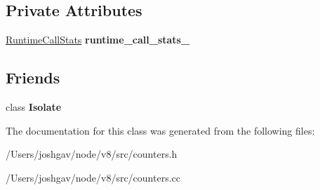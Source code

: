 \subsection*{Private Attributes}
\begin{DoxyCompactItemize}
\item 
\hyperlink{structv8_1_1internal_1_1_runtime_call_stats}{Runtime\+Call\+Stats} {\bfseries runtime\+\_\+call\+\_\+stats\+\_\+}\hypertarget{classv8_1_1internal_1_1_counters_a9da55aec8a3681c86625c43f1db4a97d}{}\label{classv8_1_1internal_1_1_counters_a9da55aec8a3681c86625c43f1db4a97d}

\end{DoxyCompactItemize}
\subsection*{Friends}
\begin{DoxyCompactItemize}
\item 
class {\bfseries Isolate}\hypertarget{classv8_1_1internal_1_1_counters_aba4f0964bdacf2bbf62cf876e5d28d0a}{}\label{classv8_1_1internal_1_1_counters_aba4f0964bdacf2bbf62cf876e5d28d0a}

\end{DoxyCompactItemize}


The documentation for this class was generated from the following files\+:\begin{DoxyCompactItemize}
\item 
/\+Users/joshgav/node/v8/src/counters.\+h\item 
/\+Users/joshgav/node/v8/src/counters.\+cc\end{DoxyCompactItemize}
